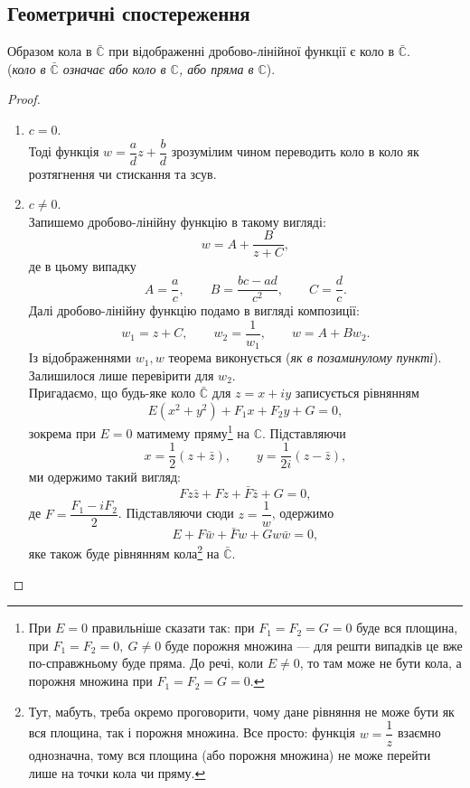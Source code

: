 \documentclass{math_library}
\begin{document}
\subsection{Геометричні спостереження}
\begin{theorem}
Образом кола в $\bar{\mathbb{C}}$ при відображенні дробово-лінійної функції є коло в $\bar{\mathbb{C}}$.\\
(\textit{коло в $\bar{\mathbb{C}}$ означає або коло в $\mathbb{C}$, або пряма в $\mathbb{C}$}).
\end{theorem}

\begin{proof}
\begin{enumerate}[topsep=0pt,label={\Roman*.}, wide=0pt]
\item $c = 0$.\\
Тоді функція $w = \dfrac{a}{d}z + \dfrac{b}{d}$ зрозумілим чином переводить коло в коло як розтягнення чи стискання та зсув.

\item $c \neq 0$.\\
Запишемо дробово-лінійну функцію в такому вигляді:
\[
w = A + \dfrac{B}{z+C},
\]
де в цьому випадку
\[
A = \dfrac{a}{c}, \qquad B = \dfrac{bc-ad}{c^2}, \qquad C = \dfrac{d}{c}.
\]
Далі дробово-лінійну функцію подамо в вигляді композиції:
\[
w_1 = z+C, \qquad w_2 = \dfrac{1}{w_1}, \qquad w = A + Bw_2.
\]
Із відображеннями $w_1,w$ теорема виконується (\textit{як в позаминулому пункті}). Залишилося лише перевірити для $w_2$.\\
Пригадаємо, що будь-яке коло $\bar{\mathbb{C}}$ для $z = x+iy$ записується рівнянням
\[
E(x^2+y^2) + F_1 x + F_2 y + G = 0,
\]
зокрема при $E = 0$ матимему пряму\footnote{При $E = 0$ правильніше сказати так: при $F_1=F_2=G=0$ буде вся площина, при $F_1=F_2=0,\ G \neq 0$ буде порожня множина --- для решти випадків це вже по-справжньому буде пряма. До речі, коли $E \neq 0$, то там може не бути кола, а порожня множина при $F_1 = F_2 = G = 0$.} на $\mathbb{C}$. Підставляючи
\[
x = \dfrac{1}{2}(z+\bar{z}), \qquad y = \dfrac{1}{2i}(z-\bar{z}),
\]
ми одержимо такий вигляд:
\[
F z\bar{z} + Fz + \bar{F} \bar{z} + G = 0,
\]
де $F = \dfrac{F_1 - iF_2}{2}$. Підставляючи сюди $z = \dfrac{1}{w}$, одержимо
\[
E + F \bar{w} + \bar{F} w + G w \bar{w} = 0,
\]
яке також буде рівнянням кола\footnote{Тут, мабуть, треба окремо проговорити, чому дане рівняння не може бути як вся площина, так і порожня множина. Все просто: функція $w = \dfrac{1}{z}$ взаємно однозначна, тому вся площина (або порожня множина) не може перейти лише на точки кола чи пряму.} на $\bar{\mathbb{C}}$. \qedhere
\end{enumerate}
\end{proof}
\end{document}
